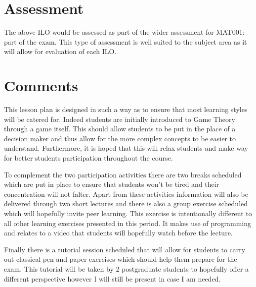 \documentclass[12pt,a4paper]{article}
\begin{document}
\section{Assessment}
The above ILO would be assessed as part of the wider assessment for MAT001: part of the exam. This type of assessment is well suited to the subject area as it will allow for evaluation of each ILO.


\section{Comments}
This lesson plan is designed in such a way as to ensure that most learning styles will be catered for. Indeed students are initially introduced to Game Theory through a game itself. This should allow students to be put in the place of a decision maker and thus allow for the more complex concepts to be easier to understand. Furthermore, it is hoped that this will relax students and make way for better students participation throughout the course.

To complement the two participation activities there are two breaks scheduled which are put in place to ensure that students won't be tired and their concentration will not falter. Apart from these activities information will also be delivered through two short lectures and there is also a group exercise scheduled which will hopefully invite peer learning. This exercise is intentionally different to all other learning exercises presented in this period. It makes use of programming and relates to a video that students will hopefully watch before the lecture.

Finally there is a tutorial session scheduled that will allow for students to carry out classical pen and paper exercises which should help them prepare for the exam. This tutorial will be taken by 2 postgraduate students to hopefully offer a different perspective however I will still be present in case I am needed.

\end{document}
